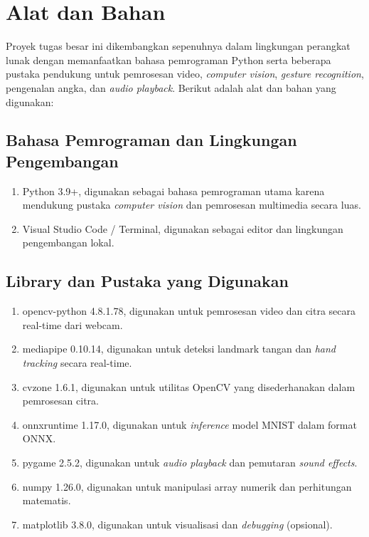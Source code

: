 \section{Alat dan Bahan}

Proyek tugas besar ini dikembangkan sepenuhnya dalam lingkungan perangkat lunak dengan memanfaatkan bahasa pemrograman Python serta beberapa pustaka pendukung untuk pemrosesan video, \textit{computer vision}, \textit{gesture recognition}, pengenalan angka, dan \textit{audio playback}. Berikut adalah alat dan bahan yang digunakan:

\subsection{Bahasa Pemrograman dan Lingkungan Pengembangan}

\begin{enumerate}
    \item Python 3.9+, digunakan sebagai bahasa pemrograman utama karena mendukung pustaka \textit{computer vision} dan pemrosesan multimedia secara luas.
    \item Visual Studio Code / Terminal, digunakan sebagai editor dan lingkungan pengembangan lokal.
\end{enumerate}

\subsection{Library dan Pustaka yang Digunakan}

\begin{enumerate}
    \item opencv-python 4.8.1.78, digunakan untuk pemrosesan video dan citra secara real-time dari webcam.
    \item mediapipe 0.10.14, digunakan untuk deteksi landmark tangan dan \textit{hand tracking} secara real-time.
    \item cvzone 1.6.1, digunakan untuk utilitas OpenCV yang disederhanakan dalam pemrosesan citra.
    \item onnxruntime 1.17.0, digunakan untuk \textit{inference} model MNIST dalam format ONNX.
    \item pygame 2.5.2, digunakan untuk \textit{audio playback} dan pemutaran \textit{sound effects}.
    \item numpy 1.26.0, digunakan untuk manipulasi array numerik dan perhitungan matematis.
    \item matplotlib 3.8.0, digunakan untuk visualisasi dan \textit{debugging} (opsional).
\end{enumerate}

